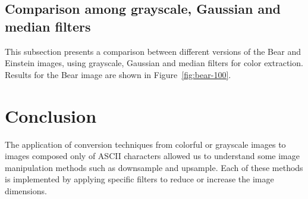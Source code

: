 \documentclass[]{IEEEtran}
\begin{document}
\subsection{Comparison among grayscale, Gaussian and median filters}

This subsection presents a comparison between different versions of the Bear and Einstein images, using grayscale, Gaussian and median filters for color extraction. Results for the Bear image are shown in Figure~\ref{fig:bear-100}.




\section{Conclusion}
 
The application of conversion techniques from colorful or grayscale images to images composed only of ASCII characters allowed us to understand some image manipulation methods such as downsample and upsample. Each of these methods is implemented by applying specific filters to reduce or increase the image dimensions.
\end{document}
